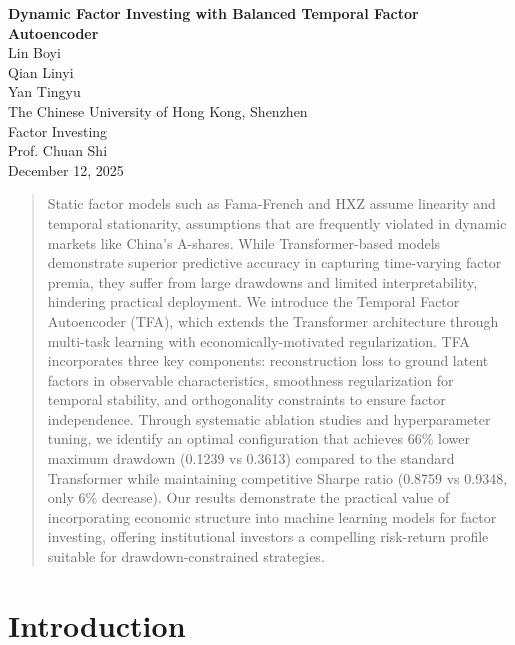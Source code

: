 \documentclass[12pt]{article}
\begin{document}
\begin{center}
\thispagestyle{empty}
\vspace*{4cm}
{\large
\begin{spacing}{2}
{\LARGE \textbf{Dynamic Factor Investing with Balanced Temporal Factor Autoencoder}}\\[0.8cm]
Lin Boyi\\
Qian Linyi\\
Yan Tingyu\\
The Chinese University of Hong Kong, Shenzhen\\
Factor Investing\\
Prof. Chuan Shi\\
December 12, 2025
\end{spacing}}
\end{center}
\clearpage

\begin{abstract}
Static factor models such as Fama-French and HXZ assume linearity and temporal stationarity, assumptions that are frequently violated in dynamic markets like China's A-shares. While Transformer-based models demonstrate superior predictive accuracy in capturing time-varying factor premia, they suffer from large drawdowns and limited interpretability, hindering practical deployment. We introduce the Temporal Factor Autoencoder (TFA), which extends the Transformer architecture through multi-task learning with economically-motivated regularization. TFA incorporates three key components: reconstruction loss to ground latent factors in observable characteristics, smoothness regularization for temporal stability, and orthogonality constraints to ensure factor independence. Through systematic ablation studies and hyperparameter tuning, we identify an optimal configuration that achieves 66\% lower maximum drawdown (0.1239 vs 0.3613) compared to the standard Transformer while maintaining competitive Sharpe ratio (0.8759 vs 0.9348, only 6\% decrease). Our results demonstrate the practical value of incorporating economic structure into machine learning models for factor investing, offering institutional investors a compelling risk-return profile suitable for drawdown-constrained strategies.
\end{abstract}

\clearpage

\section{Introduction}
\end{document}

